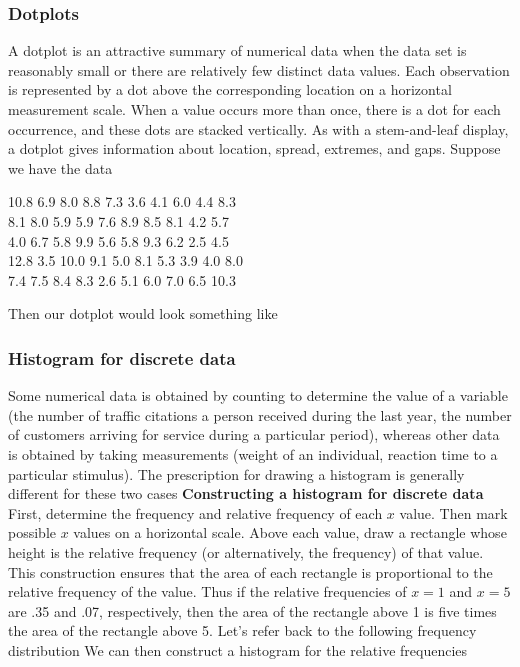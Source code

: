 \documentclass{report}
\begin{document}
\subsubsection{Dotplots}
\bigbreak \noindent 
A dotplot is an attractive summary of numerical data when the data set is reasonably
small or there are relatively few distinct data values. Each observation is represented
by a dot above the corresponding location on a horizontal measurement scale. When
a value occurs more than once, there is a dot for each occurrence, and these dots are
stacked vertically. As with a stem-and-leaf display, a dotplot gives information about
location, spread, extremes, and gaps.
\bigbreak \noindent 
Suppose we have the data
\bigbreak \noindent 
\begin{center}
    10.8 6.9 8.0 8.8 7.3 3.6 4.1 6.0 4.4 8.3 \\
    8.1 8.0 5.9 5.9 7.6 8.9 8.5 8.1 4.2 5.7 \\
    4.0 6.7 5.8 9.9 5.6 5.8 9.3 6.2 2.5 4.5 \\
    12.8 3.5 10.0 9.1 5.0 8.1 5.3 3.9 4.0 8.0 \\
    7.4 7.5 8.4 8.3 2.6 5.1 6.0 7.0 6.5 10.3
\end{center}
\bigbreak \noindent 
Then our dotplot would look something like
\bigbreak \noindent 
{}




\pagebreak 
\subsubsection{Histogram for discrete data}
\bigbreak \noindent 
Some numerical data is obtained by counting to determine the value of a variable (the
number of traffic citations a person received during the last year, the number of customers arriving for service during a particular period), whereas other data is obtained by
taking measurements (weight of an individual, reaction time to a particular stimulus).
The prescription for drawing a histogram is generally different for these two cases
\bigbreak \noindent 
\textbf{Constructing a histogram for discrete data}
\bigbreak \noindent 
First, determine the frequency and relative frequency of each $x$ value. Then mark
possible $x$ values on a horizontal scale. Above each value, draw a rectangle whose
height is the relative frequency (or alternatively, the frequency) of that value.
\bigbreak \noindent 
This construction ensures that the area of each rectangle is proportional to the relative frequency of the value. Thus if the relative frequencies of $x=1$ and $x=5$ are
.35 and .07, respectively, then the area of the rectangle above 1 is five times the area
of the rectangle above 5.
\bigbreak \noindent 
Let's refer back to the following frequency distribution
\bigbreak \noindent 
{}
\bigbreak \noindent 
We can then construct a histogram for the relative frequencies
\bigbreak \noindent 
{}
\end{document}
